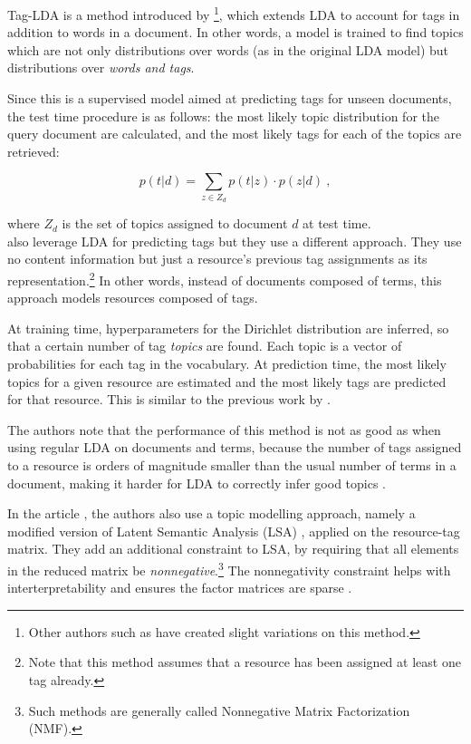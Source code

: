 Tag-LDA is a method introduced by \cite{si_sun_2008}\footnote{Other authors such as \cite{hu_etal_2012} have created slight variations on this method.}, which extends LDA to account for tags in addition to words in a document. In other words, a model is trained to find topics which are not only distributions over words (as in the original LDA model) but distributions over \textit{words and tags}. 

Since this is a supervised model aimed at predicting tags for unseen documents, the test time procedure is as follows: the most likely topic distribution for the query document are calculated, and the most likely tags for each of the topics are retrieved:

\begin{equation}
p(t | d ) = \sum_{z \in Z_d} p(t|z) \cdot p(z|d) \ ,
\end{equation}

where $Z_d$ is the set of topics assigned to document $d$ at test time.\\

\cite{krestel_fankhauser_2010} also leverage LDA for predicting tags but they use a different approach. They use no content information but just a resource's previous tag assignments as its representation.\footnote{Note that this method assumes that a resource has been assigned at least one tag already.} In other words, instead of documents composed of terms, this approach models resources composed of tags.

At training time, hyperparameters for the Dirichlet distribution are inferred, so that a certain number of tag \textit{topics} are found. Each topic is a vector of probabilities for each tag in the vocabulary. At prediction time, the most likely topics for a given resource are estimated and the most likely tags are predicted for that resource. This is similar to the previous work by \cite{si_sun_2008}.

The authors note that the performance of this method is not as good as when using regular LDA on documents and terms, because the number of tags assigned to a resource is orders of magnitude smaller than the usual number of terms in a document, making it harder for LDA to correctly infer good topics \citep{krestel_fankhauser_2010}.

In the article \cite{zhang_etal_2014}, the authors also use a topic modelling approach, namely a modified version of Latent Semantic Analysis (LSA) \citep{deerwester_etal_1990}, applied on the resource-tag matrix. They add an additional constraint to LSA, by requiring that all elements in the reduced matrix be \textit{nonnegative}.\footnote{Such methods are generally called Nonnegative Matrix Factorization (NMF).} The nonnegativity constraint helps with interterpretability and ensures the factor matrices are sparse \citep{gillis_2014}.

